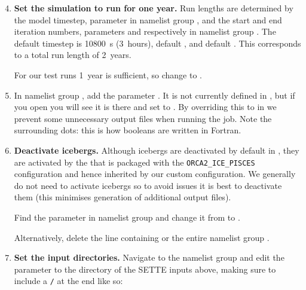 \begin{enumerate}\setcounter{enumi}{3}

    \item\textbf{Set the simulation to run for one year.}
        Run lengths are determined by the model timestep, parameter  in namelist group , and the start and end iteration numbers, parameters  and  respectively in namelist group .
        The default timestep is 10800~s (3~hours), default , and default .
        This corresponds to a total run length of 2~years.

        For our test runs 1~year is sufficient, so change  to .

    \item In namelist group , add the parameter .
        It is not currently defined in , but if you open  you will see it is there and set to \nmltrue{}.
        By overriding this to \nmlfalse{} in  we prevent some unnecessary output files when running the job.
        Note the surrounding dots: this is how booleans are written in Fortran.

    \item\textbf{Deactivate icebergs.}
        Although icebergs are deactivated by default in \linebreak{}, they are activated by the  that is packaged with the \mbox{\texttt{ORCA2_ICE_PISCES}} configuration and hence inherited by our custom configuration.
        We generally do not need to activate icebergs so to avoid issues it is best to deactivate them (this minimises generation of additional output files).

        Find the parameter  in namelist group  and change it from \nmltrue{} to \nmlfalse{}.

        Alternatively, delete the line containing  or the entire namelist group .

    \item\textbf{Set the input directories.}
        Navigate to the namelist group  and edit the parameter  to the directory of the SETTE inputs above, making sure to include a \texttt{/} at the end like so:


\end{enumerate}
